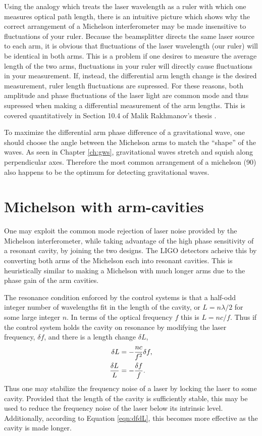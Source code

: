 Using the analogy which treats the laser wavelength as a ruler with which one measures optical path length, there is an intuitive picture which shows why the correct arrangement of a Michelson interferometer may be made insensitive to fluctuations of your ruler. %
Because the beamsplitter directs the same laser source to each arm, it is obvious that fluctuations of the laser wavelength (our ruler) will be identical in both arms. %
This is a problem if one desires to measure the average length of the two arms, fluctuations in your ruler will directly cause fluctuations in your measurement. %
If, instead, the differential arm length change is the desired measurement, ruler length fluctuations are supressed. %
For these reasons, both amplitude and phase fluctuations of the laser light are common mode and thus supressed when making a differential measurement of the arm lengths. %
This is covered quantitatively in Section 10.4 of Malik Rakhmanov's thesis \cite{Rakhmanov}.

To maximize the differential arm phase difference of a gravitational wave, one should choose the angle between the Michelson arms to match the ``shape'' %
of the waves. %
As seen in Chapter \ref{ch:gws}, gravitational waves stretch and squish along perpendicular axes. %
Therefore the most common arrangement of a michelson (90\degrees{}) also happens to be the optimum for detecting gravitational waves.

\section{Michelson with arm-cavities}
One may exploit the common mode rejection of laser noise provided by the Michelson interferometer, while taking advantage of the high phase sensitivity of a resonant cavity, by joining the two designs. %
The LIGO detectors acheive this by converting both arms of the Michelson each into resonant cavities. %
This is heuristically similar to making a Michelson with much longer arms due to the phase gain of the arm cavities.

The resonance condition enforced by the control systems is that a half-odd integer number of wavelengths fit in the length of the cavity, or $L=n\lambda/2$ for some large integer $n$. %
In terms of the optical frequency $f$ this is $L=nc/f$. %
Thus if the control system holds the cavity on resonance by modifying the laser frequency, $\delta f$, and there is a length change $\delta L$,
\begin{align}
\delta L &= -\frac{nc}{f^2}\delta f,\notag \\
\frac{\delta L}{L} &= -\frac{\delta f}{f}.
\label{eqn:dfdL}
\end{align}
Thus one may stabilize the frequency noise of a laser by locking the laser to some cavity. %
Provided that the length of the cavity is sufficiently stable, this may be used to reduce the frequency noise of the laser below its intrinsic level. %
Additionally, according to Equation \ref{eqn:dfdL}, this becomes more effective as the cavity is made longer.

